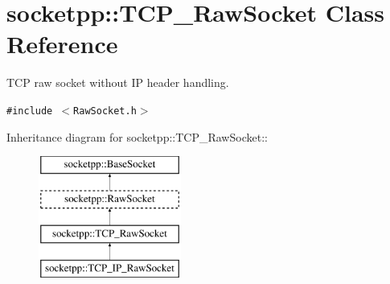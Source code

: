 \hypertarget{classsocketpp_1_1TCP__RawSocket}{
\section{socketpp::TCP\_\-RawSocket Class Reference}
\label{classsocketpp_1_1TCP__RawSocket}
}
TCP raw socket without IP header handling.  


{\tt \#include $<$RawSocket.h$>$}

Inheritance diagram for socketpp::TCP\_\-RawSocket::\begin{figure}[H]
\begin{center}
\leavevmode
\includegraphics[height=4cm]{classsocketpp_1_1TCP__RawSocket}
\end{center}
\end{figure}
